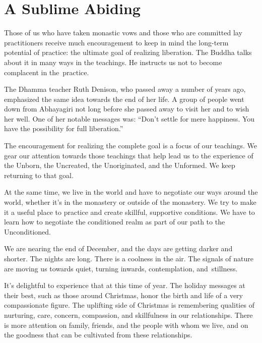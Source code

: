 
\chapter{A Sublime Abiding}

Those of us who have taken monastic vows and those who are committed lay practitioners receive much encouragement to keep in mind the long-term potential of practice: the ultimate goal of realizing \mbox{liberation.} The Buddha talks about it in many ways in the teachings. He instructs us not to become complacent in \mbox{the practice.}

The Dhamma teacher Ruth Denison, who passed away a number of years ago, emphasized the same idea towards the end of her life. A group of people went down from Abhayagiri not long before she passed away to visit her and to wish her well. One of her notable messages was: ``Don't settle for mere happiness. You have the possibility for full liberation.''

The encouragement for realizing the complete goal is a focus of our teachings. We gear our attention towards those teachings that help lead us to the experience of the Unborn, the Uncreated, the Unoriginated, and the Unformed. We keep returning to that goal.

At the same time, we live in the world and have to negotiate our ways around the world, whether it's in the monastery or outside of the monastery. We try to make it a useful place to practice and create skillful, supportive conditions. We have to learn how to negotiate the conditioned realm as part of our \linebreak path to the Unconditioned.

We are nearing the end of December, and the days are getting darker and shorter. The nights are long. There is a coolness in the air. The signals of nature are moving us towards quiet, turning inwards, contemplation, \mbox{and stillness.}

It's delightful to experience that at this time of year. The holiday messages at their best, such as those around Christmas, honor the birth and life of a very compassionate figure. The uplifting side of Christmas is remembering qualities of nurturing, care, concern, compassion, and skillfulness in our relationships. There is more attention on family, friends, and the people with whom we live, and on the goodness that can be cultivated from these relationships.

